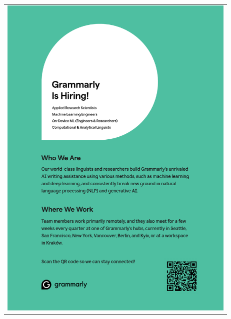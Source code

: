 \begin{center}\begin{tabular}{c}
  \includegraphics[width=4.5in]{content/ads/grammarly} \\
\end{tabular}\end{center}
